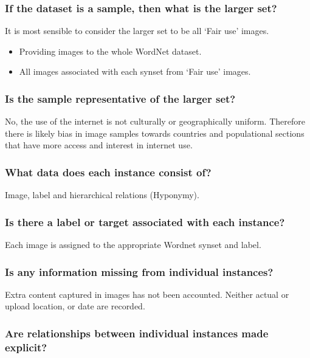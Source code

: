 \documentclass[a4paper,12pt]{article}
\begin{document}
\subsubsection*{If the dataset is a sample, then what is the larger set?}

It is most sensible to consider the larger set to be all `Fair use' images.
\begin{itemize}
\item Providing images to the whole WordNet dataset.
\item All images associated with each synset from ‘Fair use’ images.
\end{itemize}

\subsubsection*{Is the sample representative of the larger set?}
No, the use of the internet is not culturally or geographically uniform. Therefore there is likely bias in
image samples towards countries and populational sections that have more access and interest in
internet use.

\subsubsection*{What data does each instance consist of?}

Image, label and hierarchical relations (Hyponymy).

\subsubsection*{Is there a label or target associated with each instance?}

Each image is assigned to the appropriate Wordnet synset and label.

\subsubsection*{Is any information missing from individual instances?}

Extra content captured in images has not been accounted. Neither actual or upload location, or date
are recorded.

\subsubsection*{Are relationships between individual instances made explicit?}
\end{document}
